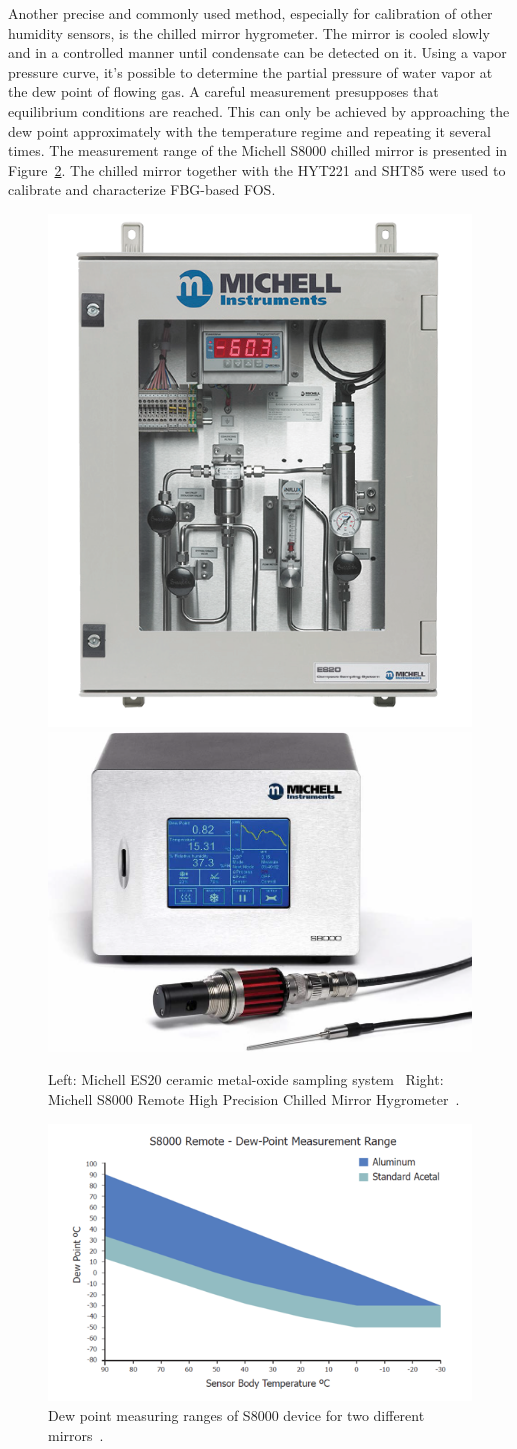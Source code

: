 Another precise and commonly used method, especially for calibration of other humidity sensors, is the chilled mirror hygrometer. The mirror is cooled slowly and in a controlled manner until condensate can be detected on it. Using a vapor pressure curve, it's possible to determine the partial pressure of water vapor at the dew point of flowing gas. A careful measurement presupposes that equilibrium conditions are reached. This can only be achieved by approaching the dew point approximately with the temperature regime and repeating it several times. The measurement range of the Michell S8000 chilled mirror is presented in Figure~\ref{fig:fos_mirror}. The chilled mirror together with the HYT221 and SHT85 were used to calibrate and characterize FBG-based \gls{FOS}. 



\begin{figure}[!h]
\centering
\includegraphics[width=0.35\columnwidth]{Chapter5/images/ES20.png}
\includegraphics[width=0.4\columnwidth]{Chapter5/images/s8000.png}
\caption{Left: Michell ES20 ceramic metal-oxide sampling system~\cite{michell_e20}
Right: Michell S8000 Remote High Precision Chilled Mirror Hygrometer~\cite{michell_s8000}.}
\label{fig:sniffer}
\end{figure}


\begin{figure}[!h]
\centering
\includegraphics[width=0.65\columnwidth]{Chapter5/images/s8000_remote.png}
\caption{Dew point measuring ranges of S8000 device for two different mirrors~\cite{michell_s8000}.}
\label{fig:fos_mirror}
\end{figure}
\newpage

